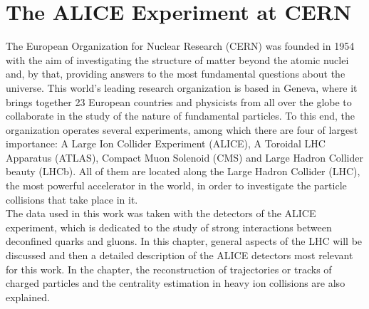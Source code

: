 \documentclass[12pt,a4paper]{report}
\begin{document}
\chapter{The ALICE Experiment at CERN}
The European Organization for Nuclear Research (CERN) was founded in 1954 with the aim of investigating the structure of matter beyond the atomic nuclei and, by that, providing answers to the most fundamental questions about the universe. This world's leading research organization is based in Geneva, where it brings together 23 European countries and physicists from all over the globe to collaborate in the study of the nature of fundamental particles. To this end, the organization operates several experiments, among which there are four of largest importance: A Large Ion Collider Experiment (ALICE), A Toroidal LHC Apparatus (ATLAS), Compact Muon Solenoid (CMS) and Large Hadron Collider beauty (LHCb). All of them are located along the Large Hadron Collider (LHC), the most powerful accelerator in the world, in order to investigate the particle collisions that take place in it. \\
The data used in this work was taken with the detectors of the ALICE experiment, which is dedicated to the study of strong interactions between deconfined quarks and gluons. In this chapter, general aspects of the LHC will be discussed and then a detailed description of the ALICE detectors most relevant for this work. In the chapter, the reconstruction of trajectories or tracks of charged particles and the centrality estimation in heavy ion collisions are also explained. 
\end{document}
